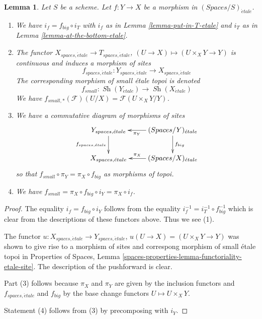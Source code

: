 \documentclass{stacks-project}
\theoremstyle{plain}
\newtheorem{lemma}[subsection]{Lemma}
\theoremstyle{definition}
\theoremstyle{remark}
\numberwithin{equation}{subsection}
\def\Sh{\mathop{\mathit{Sh}}\nolimits}
\def\etale{{\acute{e}tale}}
\begin{document}
\begin{lemma}
\label{lemma-morphism-big-small-etale}
Let $S$ be a scheme. Let $f : Y \to X$ be a morphism in
$(\textit{Spaces}/S)_\etale$.
\begin{enumerate}
\item We have $i_f = f_{big} \circ i_T$ with $i_f$ as in
Lemma \ref{lemma-put-in-T-etale} and $i_T$ as in
Lemma \ref{lemma-at-the-bottom-etale}.
\item The functor $X_{spaces, \etale} \to T_{spaces, \etale}$,
$(U \to X) \mapsto (U \times_X Y \to Y)$ is continuous and induces
a morphism of sites
$$
f_{spaces, \etale} : Y_{spaces, \etale} \longrightarrow X_{spaces, \etale}
$$
The corresponding morphism of small \'etale topoi is denoted
$$
f_{small} : \Sh(Y_\etale) \to \Sh(X_\etale)
$$
We have $f_{small, *}(\mathcal{F})(U/X) = \mathcal{F}(U \times_X Y/Y)$.
\item We have a commutative diagram of morphisms of sites
$$
\xymatrix{
Y_{spaces, \etale} \ar[d]_{f_{spaces, \etale}} &
(\textit{Spaces}/Y)_\etale \ar[d]^{f_{big}} \ar[l]^-{\pi_Y}\\
X_{spaces, \etale} &
(\textit{Spaces}/X)_\etale \ar[l]_-{\pi_X}
}
$$
so that $f_{small} \circ \pi_Y = \pi_X \circ f_{big}$ as morphisms of topoi.
\item We have $f_{small} = \pi_X \circ f_{big} \circ i_Y = \pi_X \circ i_f$.
\end{enumerate}
\end{lemma}

\begin{proof}
The equality $i_f = f_{big} \circ i_Y$ follows from the
equality $i_f^{-1} = i_T^{-1} \circ f_{big}^{-1}$ which is
clear from the descriptions of these functors above.
Thus we see (1).

\medskip\noindent
The functor $u : X_{spaces, \etale} \to Y_{spaces, \etale}$,
$u(U \to X) = (U \times_X Y \to Y)$ was shown to give
rise to a morphism of sites and correspong morphism of
small \'etale topoi in
Properties of Spaces, Lemma
\ref{spaces-properties-lemma-functoriality-etale-site}. The description
of the pushforward is clear.

\medskip\noindent
Part (3) follows because $\pi_X$ and $\pi_Y$ are given by the
inclusion functors and $f_{spaces, \etale}$ and $f_{big}$ by the
base change functors $U \mapsto U \times_X Y$.

\medskip\noindent
Statement (4) follows from (3) by precomposing with $i_Y$.
\end{proof}
\end{document}
